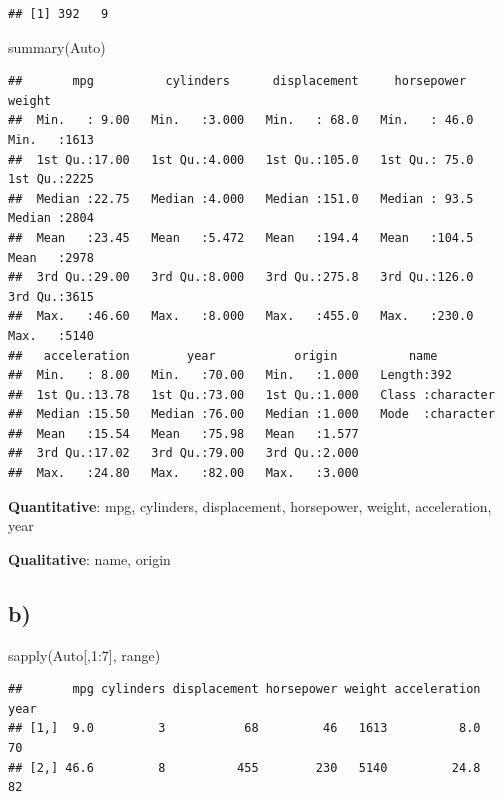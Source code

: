 \documentclass[
]{article}
\newenvironment{Shaded}{\begin{snugshade}}{\end{snugshade}}
\newcommand{\DecValTok}[1]{\textcolor[rgb]{0.00,0.00,0.81}{#1}}
\newcommand{\FunctionTok}[1]{\textcolor[rgb]{0.00,0.00,0.00}{#1}}
\newcommand{\NormalTok}[1]{#1}
\newcommand{\SpecialCharTok}[1]{\textcolor[rgb]{0.00,0.00,0.00}{#1}}
\begin{document}
\begin{verbatim}
## [1] 392   9
\end{verbatim}

\begin{Shaded}
\begin{Highlighting}[]
\FunctionTok{summary}\NormalTok{(Auto)}
\end{Highlighting}
\end{Shaded}

\begin{verbatim}
##       mpg          cylinders      displacement     horsepower        weight    
##  Min.   : 9.00   Min.   :3.000   Min.   : 68.0   Min.   : 46.0   Min.   :1613  
##  1st Qu.:17.00   1st Qu.:4.000   1st Qu.:105.0   1st Qu.: 75.0   1st Qu.:2225  
##  Median :22.75   Median :4.000   Median :151.0   Median : 93.5   Median :2804  
##  Mean   :23.45   Mean   :5.472   Mean   :194.4   Mean   :104.5   Mean   :2978  
##  3rd Qu.:29.00   3rd Qu.:8.000   3rd Qu.:275.8   3rd Qu.:126.0   3rd Qu.:3615  
##  Max.   :46.60   Max.   :8.000   Max.   :455.0   Max.   :230.0   Max.   :5140  
##   acceleration        year           origin          name          
##  Min.   : 8.00   Min.   :70.00   Min.   :1.000   Length:392        
##  1st Qu.:13.78   1st Qu.:73.00   1st Qu.:1.000   Class :character  
##  Median :15.50   Median :76.00   Median :1.000   Mode  :character  
##  Mean   :15.54   Mean   :75.98   Mean   :1.577                     
##  3rd Qu.:17.02   3rd Qu.:79.00   3rd Qu.:2.000                     
##  Max.   :24.80   Max.   :82.00   Max.   :3.000
\end{verbatim}

\textbf{Quantitative}: mpg, cylinders, displacement, horsepower, weight,
acceleration, year

\textbf{Qualitative}: name, origin

\hypertarget{b-6}{%
\subsection{b)}\label{b-6}}

\begin{Shaded}
\begin{Highlighting}[]
\FunctionTok{sapply}\NormalTok{(Auto[,}\DecValTok{1}\SpecialCharTok{:}\DecValTok{7}\NormalTok{], range)}
\end{Highlighting}
\end{Shaded}

\begin{verbatim}
##       mpg cylinders displacement horsepower weight acceleration year
## [1,]  9.0         3           68         46   1613          8.0   70
## [2,] 46.6         8          455        230   5140         24.8   82
\end{verbatim}
\end{document}
